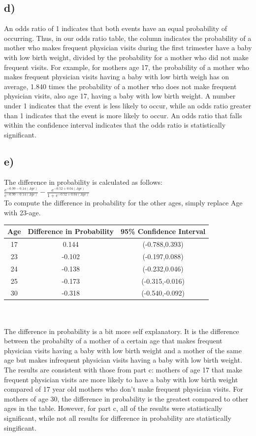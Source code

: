 \documentclass[12pt, letterpaper]{article}
\begin{document}
\subsection*{d)} An odds ratio of 1 indicates that both events have an equal probability of occurring. Thus, in our odds ratio table, the column indicates the probability of a mother who makes frequent physician visits during the first trimester have a baby with low birth weight, divided by the probability for a mother who did not make frequent visits. For example, for mothers age 17, the probability of a mother who makes frequent physician visits having a baby with low birth weigh has on average, 1.840 times the probability of a mother who does not make frequent physician visits, also age 17,  having a baby with low birth weight. A number under 1 indicates that the event is less likely to occur, while an odds ratio greater than 1 indicates that the event is more likely to occur. An odds ratio that falls within the confidence interval indicates that the odds ratio is statistically significant.

\subsection*{e)} The difference in probability is calculated as follows: \\
$\frac{e^{-0.99-0.14(Age)}}{e^{-0.99-0.14(Age)}}-\frac{e^{-0.52+0.04(Age)}}{1+e^{-0.52+0.04(Age)}}$\\
To compute the difference in probability for the other ages, simply replace Age with 23-age.\\
 \begin{tabular}{ |c|c|c| } 
 \hline
 \textbf{Age} & \textbf{Difference in Probability} & \textbf{95\% Confidence Interval} \\ 
\hline
 17 & 0.144 & (-0.788,0.393) \\ 
\hline
 23 & -0.102 & (-0.197,0.088) \\ 
 \hline
 24 & -0.138 & (-0.232,0.046) \\ 
 \hline
 25 & -0.173 & (-0.315,-0.016) \\ 
 \hline
 30 & -0.318 & (-0.540,-0.092) \\ 
 \hline
\end{tabular}\\\\
The difference in probability is a bit more self explanatory. It is the difference between the probabilty of a mother of a certain age that makes frequent physician visits having a baby with low birth weight and a mother of the same age but makes infrequent physician visits having a baby with low birth weight. The results are consistent with those from part c: mothers of age 17 that make frequent physician visits are more likely to have a baby with low birth weight compared of 17 year old mothers who don't make frequent physician visits. For mothers of age 30, the difference in probability is the greatest compared to other ages in the table. However, for part c, all of the results were statistically significant, while not all results for difference in probability are statistically singificant.
\end{document}
